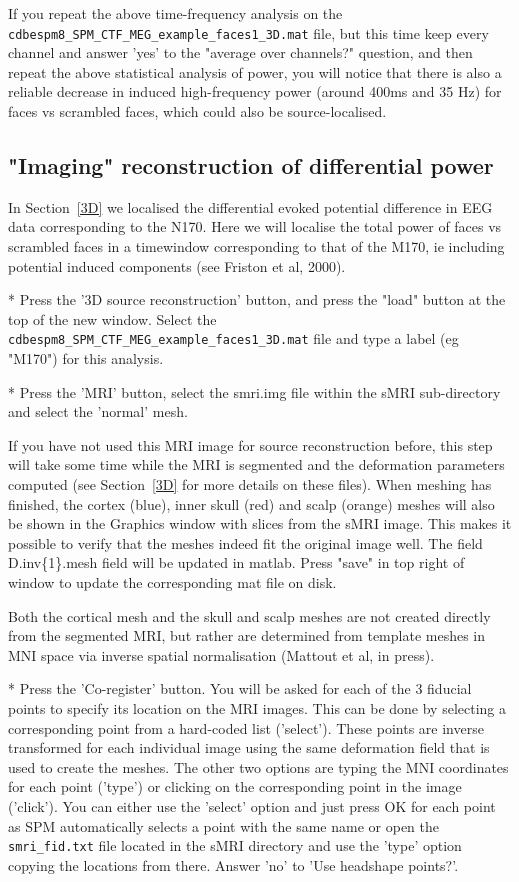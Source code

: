 If you repeat the above time-frequency analysis on the \verb!cdbespm8_SPM_CTF_MEG_example_faces1_3D.mat! file, but this time keep every channel and answer 'yes' to the "average over channels?" question, and then repeat the above statistical analysis of power, you will notice that there is also a reliable decrease in induced high-frequency power (around 400ms and 35 Hz) for faces vs scrambled faces, which could also be source-localised.


\subsection{"Imaging" reconstruction of differential power}

In Section~\ref{3D} we localised the differential evoked potential difference in EEG data corresponding to the N170.  Here we will localise the total power of faces vs scrambled faces in a timewindow corresponding to that of the M170, ie including potential induced components (see Friston et al, 2000).

* Press the '3D source reconstruction' button, and press the "load" button at the top of the new window. Select the \verb!cdbespm8_SPM_CTF_MEG_example_faces1_3D.mat! file and type a label (eg "M170") for this analysis.

* Press the 'MRI' button, select the smri.img file within the sMRI sub-directory and select the 'normal' mesh.

If you have not used this MRI image for source reconstruction before, this step will take some time while the MRI is segmented and the deformation parameters computed (see Section~\ref{3D} for more details on these files). When meshing has finished, the cortex (blue), inner skull (red) and scalp (orange) meshes will also be shown in the Graphics window with slices from the sMRI image. This makes it possible to verify that the meshes indeed fit the original image well. The field D.inv\{1\}.mesh field will be updated in matlab. Press "save" in top right of window to update the corresponding mat file on disk.

Both the cortical mesh and the skull and scalp meshes are not created directly from the segmented MRI, but rather are determined from template meshes in MNI space via inverse spatial normalisation (Mattout et al, in press).

* Press the 'Co-register' button. You will be asked for each of the 3 fiducial points to specify its location on the MRI images. This can be done by  selecting a corresponding point from a hard-coded list ('select'). These points are inverse transformed for each individual image using the same deformation field that is used to create the meshes. The other two options are typing the MNI coordinates for each point ('type') or clicking on the corresponding point in the image ('click'). You can either use the 'select' option and just press OK for each point as SPM automatically selects a point with the same name or open the \verb!smri_fid.txt! file located in the sMRI directory and use the 'type' option copying the locations from there. Answer 'no' to 'Use headshape points?'.

